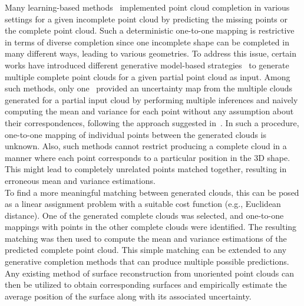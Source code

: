 Many learning-based methods~\cite{PCN, PoinTr, PointAttN, P2C, VarPCN, PCNSkip, Snowflake} implemented point cloud completion in various settings for a given incomplete point cloud by predicting the missing points or the complete point cloud. Such a deterministic one-to-one mapping is restrictive in terms of diverse completion since one incomplete shape can be completed in many different ways, leading to various geometries. To address this issue, certain works have introduced different generative model-based strategies~\cite{HyperPocket, CGAN, PCCIMLE, EBResLT} to generate multiple complete point clouds for a given partial point cloud as input. Among such methods, only one~\cite{EBResLT} provided an uncertainty map from the multiple clouds generated for a partial input cloud by performing multiple inferences and naively computing the mean and variance for each point without any assumption about their correspondences, following the approach suggested in~\cite{UncertDeepL}. In such a procedure, one-to-one mapping of individual points between the generated clouds is unknown. Also, such methods cannot restrict producing a complete cloud in a manner where each point corresponds to a particular position in the 3D shape. This might lead to completely unrelated points matched together, resulting in erroneous mean and variance estimations.
\\
To find a more meaningful matching between generated clouds, this can be posed as a linear assignment problem with a suitable cost function (e.g., Euclidean distance). One of the generated complete clouds was selected, and one-to-one mappings with points in the other complete clouds were identified. The resulting matching was then used to compute the mean and variance estimations of the predicted complete point cloud. This simple matching can be extended to any generative completion methods that can produce multiple possible predictions. Any existing method of surface reconstruction from unoriented point clouds can then be utilized to obtain corresponding surfaces and empirically estimate the average position of the surface along with its associated uncertainty.
\newline
 
